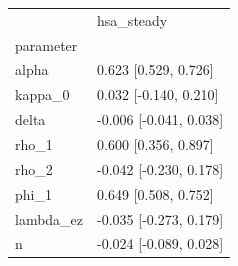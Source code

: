 \begin{tabular}{ll}
\toprule
 & hsa\_steady \\
parameter &  \\
\midrule
alpha & 0.623 [0.529, 0.726] \\
kappa\_0 & 0.032 [-0.140, 0.210] \\
delta & -0.006 [-0.041, 0.038] \\
rho\_1 & 0.600 [0.356, 0.897] \\
rho\_2 & -0.042 [-0.230, 0.178] \\
phi\_1 & 0.649 [0.508, 0.752] \\
lambda\_ez & -0.035 [-0.273, 0.179] \\
n & -0.024 [-0.089, 0.028] \\
\bottomrule
\end{tabular}
